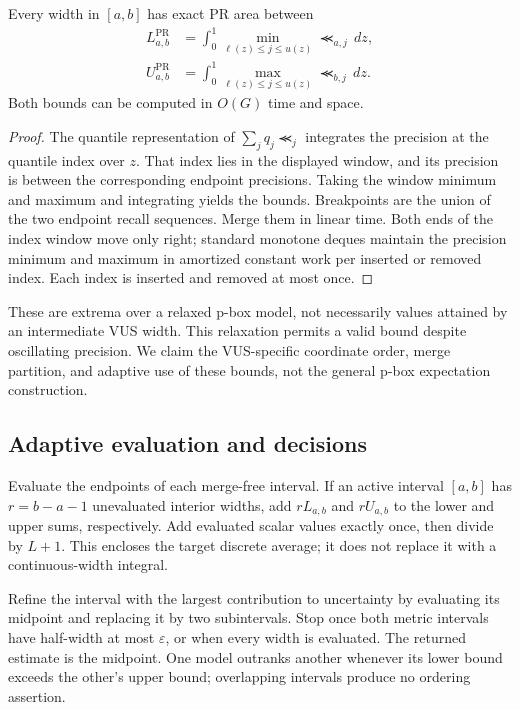\begin{theorem}
Every width in $[a,b]$ has exact PR area between
\begin{align}
 L_{a,b}^{\mathrm{PR}}
 &=\int_0^1\min_{\ell(z)\le j\le u(z)}\Prec_{a,j}\,dz,\\
 U_{a,b}^{\mathrm{PR}}
 &=\int_0^1\max_{\ell(z)\le j\le u(z)}\Prec_{b,j}\,dz .
\end{align}
Both bounds can be computed in $O(G)$ time and space.
\end{theorem}
\begin{proof}
The quantile representation of $\sum_jq_j\Prec_j$ integrates the precision
at the quantile index over $z$. That index lies in the displayed window,
and its precision is between the corresponding endpoint precisions.
Taking the window minimum and maximum and integrating yields the bounds.
Breakpoints are the union of the two endpoint recall sequences. Merge them
in linear time. Both ends of the index window move only right; standard
monotone deques maintain the precision minimum and maximum in amortized
constant work per inserted or removed index. Each index is inserted and
removed at most once.
\end{proof}
These are extrema over a relaxed p-box model, not necessarily values
attained by an intermediate VUS width. This relaxation permits a valid bound
despite oscillating precision. We claim the VUS-specific coordinate order,
merge partition, and adaptive use of these bounds, not the general p-box
expectation construction.

\subsection{Adaptive evaluation and decisions}
Evaluate the endpoints of each merge-free interval. If an active interval
$[a,b]$ has $r=b-a-1$ unevaluated interior widths, add $rL_{a,b}$ and
$rU_{a,b}$ to the lower and upper sums, respectively. Add evaluated scalar
values exactly once, then divide by $L+1$. This encloses the target discrete
average; it does not replace it with a continuous-width integral.

Refine the interval with the largest contribution to uncertainty by
evaluating its midpoint and replacing it by two subintervals.
Stop once both metric intervals have half-width at most $\varepsilon$,
or when every width is evaluated. The returned estimate is the midpoint.
One model outranks another whenever its lower bound exceeds the other's
upper bound; overlapping intervals produce no ordering assertion.

